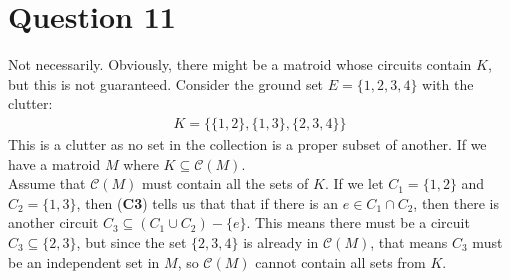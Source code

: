 \documentclass[a4paper, fleqn]{article}
\begin{document}
\section*{Question 11}
Not necessarily. Obviously, there might be a matroid whose circuits contain $K$, but this
is not guaranteed. Consider the ground set $E=\{1,2,3,4\}$ with the clutter:
\begin{align*}
  K=\{\{1,2\},\{1,3\},\{2,3,4\}\}
\end{align*}
This is a clutter as no set in the collection is a proper subset of another. If we have a
matroid $M$ where $K\subseteq \mathcal{C}(M)$. \\
Assume that $\mathcal{C}(M)$ must contain all the sets of $K$. If we let $C_1=\{1,2\}$ and
$C_2=\{1,3\}$, then (\textbf{C3}) tells us that that if there is an $e\in C_1\cap C_2$,
then there is another circuit $C_3\subseteq (C_1\cup C_2)-\{e\}$. This means there must be
a circuit $C_3\subseteq \{2,3\}$, but since the set $\{2,3,4\}$ is already in
$\mathcal{C}(M)$, that means $C_3$ must be an independent set in $M$, so $\mathcal{C}(M)$
cannot contain all sets from $K$.
\end{document}

